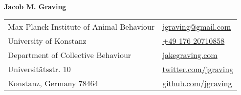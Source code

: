 \documentclass[letterpaper,10pt,oneside]{article}
\begin{document}

\hspace{1mm} \LARGE{\textbf{Jacob M. Graving}}  \\
\normalsize



\begin{center}
\begin{tabular}{l l}
 Max Planck Institute of Animal Behaviour		& \hspace{2in} \href{mailto:jgraving@gmail.com}{\faEnvelope{ } jgraving@gmail.com} \\
 University of Konstanz		& \hspace{2in}   \href{tel:+4917620710858 }{\faPhone{ } +49 176 20710858 }  \\
 Department of Collective Behaviour     & \hspace{2in}  \href{http://jakegraving.com/}{\faGlobe{ } jakegraving.com}   \\
 Universit\"{a}tsstr. 10             & \hspace{2in}  \href{https://twitter.com/jgraving}{\faTwitter{ }  twitter.com/jgraving}   \\
 Konstanz, Germany 78464 & \hspace{2in} \href{https://github.com/jgraving}{\faGithub{ }  github.com/jgraving} \\
\end{tabular}
\end{center}

\end{document}
